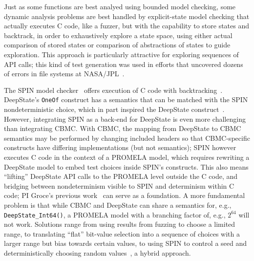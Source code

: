Just as some functions are best analyed using bounded model checking, some dynamic analysis problems are best handled by explicit-state model checking that actually executes C code, like a fuzzer, but with the capability to store states and backtrack, in order to exhaustively explore a state space, using either actual comparison of stored states or comparison of abstractions of states to guide exploration.  This approach is particularly attractive for exploring sequences of API calls; this kind of test generation was used in efforts that uncovered dozens of errors in file systems at NASA/JPL~\cite{AMAI}.

The SPIN model checker~\cite{SPIN} offers execution of C code with backtracking~\cite{ModelDriven,ModelCode}.  DeepState's {\tt OneOf} construct has a semantics that can be matched with the SPIN nondeterministic choice, which in part inspired the DeepState construct~\cite{WODA08,WODACommon}.  However, integrating SPIN as a back-end for DeepState is even more challenging than integrating CBMC.  With CBMC, the mapping from DeepState to CBMC semantics may be performed by changing included headers so that CBMC-specific constructs have differing implementations (but not semantics); SPIN however executes C code in the context of a PROMELA model, which requires rewriting a DeepState model to embed test choices inside SPIN's constructs.  This also means ``lifting'' DeepState API calls to the PROMELA level outside the C code, and bridging between nondeterminism visible to SPIN and determinism within C code; PI Groce's previous work~\cite{WODA08} can serve as a foundation.  A more fundamental problem is that while CBMC and DeepState can share a semantics for, e.g., {\tt DeepState\_Int64()}, a PROMELA model with a branching factor of, e.g., $2^{64}$ will not work.  Solutions range from using results from fuzzing to choose a limited range, to translating ``flat'' bit-value selection into a sequence of choices with a larger range but bias towards certain values, to using SPIN to control a seed and deterministically choosing random values~\cite{WODA08}, a hybrid approach.  